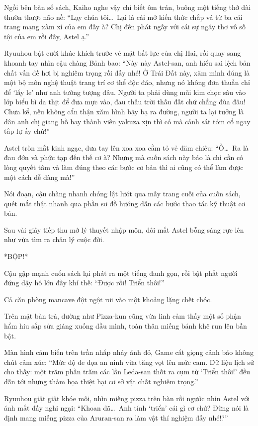 \documentclass[../main.tex]{subfiles}
\begin{document}
Ngồi bên bàn sổ sách, Kaiho nghe vậy chỉ biết ôm trán, buông một tiếng thở dài thườn thượt não nề: ``Lạy chúa tôi\dots\ Lại là cái mớ kiến thức chắp vá từ ba cái trang mạng xàm xí của em đấy à? Chị đến phát ngấy với cái sự ngây thơ vô số tội của em rồi đấy, Astel ạ.''

Ryuuhou bật cười khúc khích trước vẻ mặt bất lực của chị Hai, rồi quay sang khoanh tay nhìn cậu chàng Bảnh bao: ``Này này Astel-san, anh hiểu sai lệch bản chất vấn đề hơi bị nghiêm trọng rồi đấy nhé! Ở Trái Đất này, xăm mình đúng là một bộ môn nghệ thuật trang trí cơ thể độc đáo, nhưng nó không đơn thuần chỉ để `lấy le' như anh tưởng tượng đâu. Người ta phải dùng mũi kim chọc sâu vào lớp biểu bì da thịt để đưa mực vào, đau thấu trời thấu đất chứ chẳng đùa đâu! Chưa kể, nếu không cẩn thận xăm hình bậy bạ ra đường, người ta lại tưởng là dân anh chị giang hồ hay thành viên yakuza xịn thì có mà cảnh sát tóm cổ ngay tắp lự ấy chứ!''

Astel tròn mắt kinh ngạc, đưa tay lên xoa xoa cằm tỏ vẻ đăm chiêu: ``Ồ\dots\ Ra là đau đớn và phức tạp đến thế cơ à? Nhưng mà cuốn sách này bảo là chỉ cần có lòng quyết tâm và làm đúng theo các bước cơ bản thì ai cũng có thể làm được một cách dễ dàng mà!''

Nói đoạn, cậu chàng nhanh chóng lật lướt qua mấy trang cuối của cuốn sách, quét mắt thật nhanh qua phần sơ đồ hướng dẫn các bước thao tác kỹ thuật cơ bản.

Sau vài giây tiếp thu mớ lý thuyết nhập môn, đôi mắt Astel bỗng sáng rực lên như vừa tìm ra chân lý cuộc đời.

*BỘP!*

Cậu gập mạnh cuốn sách lại phát ra một tiếng đanh gọn, rồi bật phắt người đứng dậy hô lớn đầy khí thế: ``Được rồi! Triển thôi!''

Cả căn phòng mancave đột ngột rơi vào một khoảng lặng chết chóc.

Trên mặt bàn trà, dường như Pizza-kun cũng vừa linh cảm thấy một số phận hẩm hiu sắp sửa giáng xuống đầu mình, toàn thân miếng bánh khẽ run lên bần bật.

Màn hình cảm biến trên trần nhấp nháy ánh đỏ, Game cất giọng cảnh báo không chút cảm xúc: ``Mức độ đe dọa an ninh vừa tăng vọt lên mức cam. Dữ liệu lịch sử cho thấy: một trăm phần trăm các lần Leda-san thốt ra cụm từ `Triển thôi!' đều dẫn tới những thảm họa thiệt hại cơ sở vật chất nghiêm trọng.''

Ryuuhou giật giật khóe môi, nhìn miếng pizza trên bàn rồi ngước nhìn Astel với ánh mắt đầy nghi ngại: ``Khoan đã\dots\ Anh tính `triển' cái gì cơ chứ? Đừng nói là định mang miếng pizza của Aruran-san ra làm vật thí nghiệm đấy nhé!?''
\end{document}
